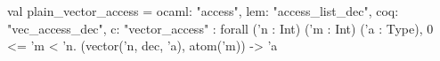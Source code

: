 val plain_vector_access = {
  ocaml: "access",
  lem: "access_list_dec",
  coq: "vec_access_dec",
  c: "vector_access"
} : forall ('n : Int) ('m : Int) ('a : Type), 0 <= 'm < 'n. (vector('n, dec, 'a), atom('m)) -> 'a
